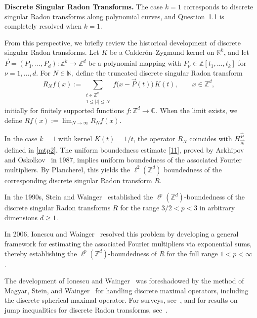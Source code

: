 \documentclass[11 pt,letterpaper]{amsart}
\theoremstyle{plain}
\theoremstyle{definition}
\theoremstyle{remark} \theoremstyle{exam} \theoremstyle{ob}
\numberwithin{equation}{section}
\begin{document}
\noindent \textbf{Discrete Singular Radon Transforms.}
The case $k=1$ corresponds to discrete singular Radon transforms
along polynomial curves, and Question~1.1 is completely resolved
when $k=1$. 

 From this perspective, we briefly review the historical development of discrete singular Radon transforms.
Let $K$ be a Calder\'on--Zygmund kernel on $\mathbb{R}^k$, and let 
$\vec{P}=(P_1,\dots,P_d):\mathbb{Z}^k\to \mathbb{Z}^d$ be a polynomial mapping with 
$P_\nu \in \mathbb{Z}[t_1,\dots,t_k]$ for $\nu=1,\dots,d$. 
For $N\in\mathbb{N}$, define the truncated discrete singular Radon transform
\[
R_N f(x)
:=
\sum_{\substack{t\in \mathbb{Z}^k\\ 1\le |t|\le N}}
f\bigl(x-\vec P(t)\bigr)\,K(t),
\qquad x\in \mathbb{Z}^d,
\]
initially for finitely supported functions $f:\mathbb{Z}^d\to\mathbb{C}$. 
When the limit exists, we define $Rf(x):=\lim_{N\to\infty}R_N f(x)$.


In the case \(k=1\) with kernel \(K(t)=1/t\), the operator \(R_N\) coincides with \(H_{\vec{N}}^{\vec{P}}\) defined in \eqref{mtp2}.
 The uniform boundedness estimate \eqref{11}, proved by Arkhipov and
 Oskolkov~\cite{AO} in 1987, implies uniform boundedness of the
 associated Fourier multipliers. By Plancherel, this yields the $\ell^2(\mathbb{Z}^d)$ boundedness of the corresponding discrete singular Radon transform $R$.

In the 1990s, Stein and Wainger~\cite{SW2,SW3} established the $\ell^p(\mathbb{Z}^d)$-boundedness of the discrete singular Radon transforms $R$ for the range $3/2< p < 3$ in arbitrary dimensions $d\ge 1$.    


In 2006, Ionescu and Wainger~\cite{IW} resolved this problem by developing a general framework for estimating the associated Fourier multipliers via exponential sums, thereby establishing the $\ell^p(\mathbb{Z}^d)$-boundedness of $R$ for the full range $1<p<\infty$.

The development of Ionescu and Wainger~\cite{IW}  was foreshadowed by the method of Magyar, Stein, and Wainger~\cite{MSW} for handling discrete maximal operators, including the discrete spherical maximal operator. For surveys, see~\cite{IMW}, and for results on jump inequalities for discrete Radon transforms, see~\cite{MSZ}.  \\
\end{document}
